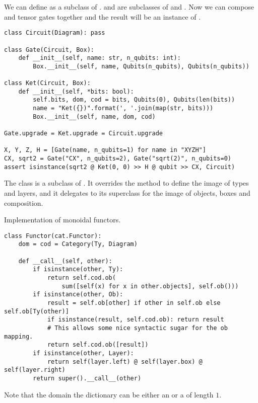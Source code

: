 \begin{example}
We can define  as a subclass of .  and  are subclasses of  and .
Now we can compose and tensor gates together and the result will be an instance of .

\begin{verbatim}
class Circuit(Diagram): pass

class Gate(Circuit, Box):
    def __init__(self, name: str, n_qubits: int):
        Box.__init__(self, name, Qubits(n_qubits), Qubits(n_qubits))

class Ket(Circuit, Box):
    def __init__(self, *bits: bool):
        self.bits, dom, cod = bits, Qubits(0), Qubits(len(bits))
        name = "Ket({})".format(', '.join(map(str, bits)))
        Box.__init__(self, name, dom, cod)

Gate.upgrade = Ket.upgrade = Circuit.upgrade

X, Y, Z, H = [Gate(name, n_qubits=1) for name in "XYZH"]
CX, sqrt2 = Gate("CX", n_qubits=2), Gate("sqrt(2)", n_qubits=0)
assert isinstance(sqrt2 @ Ket(0, 0) >> H @ qubit >> CX, Circuit)
\end{verbatim}
\end{example}

The  class is a subclass of .
It overrides the  method to define the image of types and layers, and it delegates to its superclass for the image of objects, boxes and composition.

\begin{python}
{\normalfont Implementation of monoidal functors.}
\begin{verbatim}
class Functor(cat.Functor):
    dom = cod = Category(Ty, Diagram)

    def __call__(self, other):
        if isinstance(other, Ty):
            return self.cod.ob(
                sum([self(x) for x in other.objects], self.ob()))
        if isinstance(other, Ob):
            result = self.ob[other] if other in self.ob else self.ob[Ty(other)]
            if isinstance(result, self.cod.ob): return result
            # This allows some nice syntactic sugar for the ob mapping.
            return self.cod.ob([result])
        if isinstance(other, Layer):
            return self(layer.left) @ self(layer.box) @ self(layer.right)
        return super().__call__(other)
\end{verbatim}

Note that the domain the dictionary  can be either an  or a  of length $1$.
\end{python}

